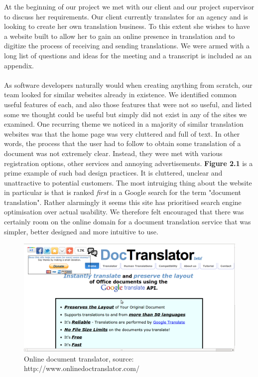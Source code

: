 \documentclass{l3proj}
\begin{document}
At the beginning of our project we met with our client and our project supervisor to discuss her requirements. Our client currently translates for an agency and is looking to create her own translation business. To this extent she wishes to have a website built to allow her to gain an online presence in translation and to digitize the process of receiving and sending translations. We were armed with a long list of questions and ideas for the meeting and a transcript is included as an appendix.\\
\\
As software developers naturally would when creating anything from scratch, our team looked for similar websites already in existence. We identified common useful features of each, and also those features that were not so useful, and listed some we thought could be useful but simply did not exist in any of the sites we examined. One recurring theme we noticed in a majority of similar translation websites was that the home page was very cluttered and full of text. In other words, the process that the user had to follow to obtain some translation of a document was not extremely clear. Instead, they were met with various registration options, other services and annoying advertisements. \textbf{Figure 2.1} is a prime example of such bad design practices. It is cluttered, unclear and unattractive to potential customers. The most intruiging thing about the website in particular is that is ranked \textit{first} in a Google search for the term "document translation". Rather alarmingly it seems this site has prioritised search engine optimisation over actual usability. We therefore felt encouraged that there was certainly room on the online domain for a document translation service that was simpler, better designed and more intuitive to use.

\begin{figure}
\begin{center}
\includegraphics[scale=0.4]{ex1doctrans}
\caption{Online document translator, source: http://www.onlinedoctranslator.com/}
\end{center}
\end{figure}
\end{document}
